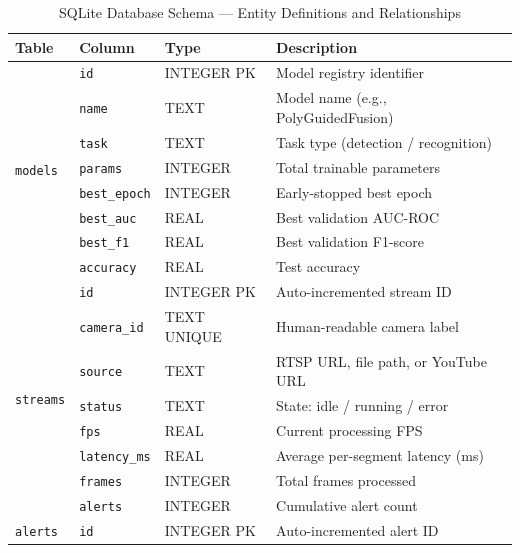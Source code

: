 \documentclass[12pt]{article}
\begin{document}
\begin{table}[H]
    \centering
    \caption{SQLite Database Schema — Entity Definitions and Relationships}
    \label{tab:db_schema}
    \small
    \renewcommand{\arraystretch}{1.15}
    \begin{tabular}{llll}
        \toprule
        \textbf{Table} & \textbf{Column} & \textbf{Type} & \textbf{Description} \\
        \midrule
        \multirow{8}{*}{\texttt{models}}
            & \texttt{id}          & INTEGER PK   & Model registry identifier \\
            & \texttt{name}        & TEXT         & Model name (e.g., PolyGuidedFusion) \\
            & \texttt{task}        & TEXT         & Task type (detection / recognition) \\
            & \texttt{params}      & INTEGER      & Total trainable parameters \\
            & \texttt{best\_epoch} & INTEGER      & Early-stopped best epoch \\
            & \texttt{best\_auc}   & REAL         & Best validation AUC-ROC \\
            & \texttt{best\_f1}    & REAL         & Best validation F1-score \\
            & \texttt{accuracy}    & REAL         & Test accuracy \\
        \midrule
        \multirow{8}{*}{\texttt{streams}}
            & \texttt{id}          & INTEGER PK   & Auto-incremented stream ID \\
            & \texttt{camera\_id}  & TEXT UNIQUE  & Human-readable camera label \\
            & \texttt{source}      & TEXT         & RTSP URL, file path, or YouTube URL \\
            & \texttt{status}      & TEXT         & State: idle / running / error \\
            & \texttt{fps}         & REAL         & Current processing FPS \\
            & \texttt{latency\_ms} & REAL         & Average per-segment latency (ms) \\
            & \texttt{frames}      & INTEGER      & Total frames processed \\
            & \texttt{alerts}      & INTEGER      & Cumulative alert count \\
        \midrule
        \multirow{8}{*}{\texttt{alerts}}
            & \texttt{id}          & INTEGER PK   & Auto-incremented alert ID \\

\end{tabular}
\end{table}
\end{document}
